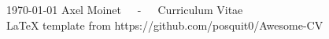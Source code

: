 \documentclass[11pt, a4paper]{awesome-cv}
\begin{document}
\makecvheader

\makecvfooter
  {\today}
  {Axel Moinet~~~-~~~Curriculum Vitae\\ LaTeX template from https://github.com/posquit0/Awesome-CV}
  {\thepage}


~\vspace{0.4cm}




\clearpage


% 
% 


% 


\end{document}
